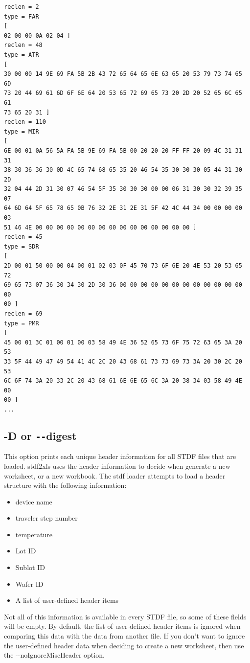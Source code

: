 \documentclass[letterpaper]{article}
\begin{document}
\begin{verbatim}
reclen = 2
type = FAR
[
02 00 00 0A 02 04 ]
reclen = 48
type = ATR
[
30 00 00 14 9E 69 FA 5B 2B 43 72 65 64 65 6E 63 65 20 53 79 73 74 65 6D
73 20 44 69 61 6D 6F 6E 64 20 53 65 72 69 65 73 20 2D 20 52 65 6C 65 61
73 65 20 31 ]
reclen = 110
type = MIR
[
6E 00 01 0A 56 5A FA 5B 9E 69 FA 5B 00 20 20 20 FF FF 20 09 4C 31 31 31
38 30 36 36 30 0D 4C 65 74 68 65 35 20 46 54 35 30 30 30 05 44 31 30 2D
32 04 44 2D 31 30 07 46 54 5F 35 30 30 30 00 00 06 31 30 30 32 39 35 07
64 6D 64 5F 65 78 65 0B 76 32 2E 31 2E 31 5F 42 4C 44 34 00 00 00 00 03
51 46 4E 00 00 00 00 00 00 00 00 00 00 00 00 00 00 00 ]
reclen = 45
type = SDR
[
2D 00 01 50 00 00 04 00 01 02 03 0F 45 70 73 6F 6E 20 4E 53 20 53 65 72
69 65 73 07 36 30 34 30 2D 30 36 00 00 00 00 00 00 00 00 00 00 00 00 00
00 ]
reclen = 69
type = PMR
[
45 00 01 3C 01 00 01 00 03 58 49 4E 36 52 65 73 6F 75 72 63 65 3A 20 53
33 5F 44 49 47 49 54 41 4C 2C 20 43 68 61 73 73 69 73 3A 20 30 2C 20 53
6C 6F 74 3A 20 33 2C 20 43 68 61 6E 6E 65 6C 3A 20 38 34 03 58 49 4E 00
00 ]
...
\end{verbatim}

\subsection{\bf -D or \texttt{-{}-}digest}
This option prints each unique header information for all STDF files that are loaded.
stdf2xls uses the header information to decide when generate a new worksheet, or a new
workbook.  The stdf loader attempts to load a header structure with the following
information:
\begin{itemize}
\item device name
\item traveler step number
\item temperature
\item Lot ID
\item Sublot ID
\item Wafer ID
\item A list of user-defined header items
\end{itemize}
Not all of this information is available in every STDF file, so some of these
fields will be empty.  By default, the list of user-defined header items
is ignored when comparing this data with the data from another file.
If you don't want to ignore the user-defined header data when deciding to
create a new worksheet, then use the -{}-noIgnoreMiscHeader option.
\end{document}
